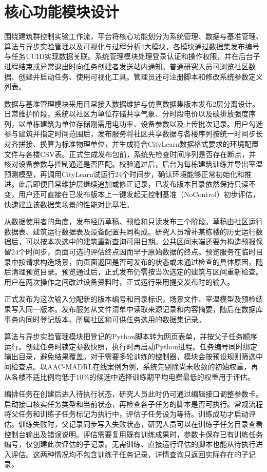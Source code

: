 \section{核心功能模块设计}\label{sec:core-modules}
围绕建筑群控制实验工作流，平台将核心功能划分为系统管理、数据与基准管理、算法与异步实验管理以及可视化与过程分析4大模块，各模块通过数据集发布编号与任务UUID实现数据关联。系统管理模块处理登录认证和操作权限，并在后台子进程结束或异常退出时向任务创建者发送站内通知。普通研究人员可浏览社区数据、创建并启动任务、使用可视化工具。管理员还可注册脚本和修改系统参数定义列表。

数据与基准管理模块采用日常接入数据维护与仿真数据集版本发布2层分离设计。日常维护阶段，系统以社区为单位存储共享气象、分时段电价以及碳排放强度序列，以单栋建筑为单位存储刚需用电功率、设备参数以及上传批次记录。用户勾选参与建筑并指定时间范围后，发布服务将社区共享数据与各楼序列按统一时间步长对齐拼接、换算为标准物理单位，并生成符合CityLearn数据格式要求的环境配置文件与各楼CSV表。正式生成发布包前，系统先检查时间序列是否存在断点，并核对设备参数与控制通道是否匹配。校验通过后，后台为每栋建筑训练并导出室温预测模型，再调用CityLearn试运行24个时间步，确认环境能够正常初始化和推进。此后即便日常维护层继续追加或修正记录，已发布版本目录依然保持只读不变，用户还可直接在已发布版本上一键发起无控制基准（NoControl）初步评估，快速建立该数据集场景的性能对比基准。

从数据使用者的角度，发布经历草稿、预检和只读发布三个阶段。草稿由社区运行数据表、建筑运行数据表及设备配置共同构成。研究人员增补某栋楼的历史运行数据后，可以按本次选中的建筑重新查询可用日期。公共区间末端还要为构造预报保留24个时间步，页面可选的评估终点因而早于原始数据的终点。预览服务在临时目录中按请求构造场景，向页面返回是否可发布的状态或未通过检查的具体原因，随后清理预览目录。预览通过后，正式发布仍需按当次选定的建筑与区间重新检查。用户在两次操作之间改过设备资料时，正式运行采用提交发布时的输入。

正式发布为这次输入分配新的版本编号和目录标识，场景文件、室温模型及预检结果写入同一版本。发布服务从文件清单中读取来源记录和内容摘要，随后在数据库事务内同时登记版本、所属社区和可供任务选用的数据集记录。

算法与异步实验管理模块把登记的Python脚本转为网页表单，并按父子任务顺序运行。创建任务时锁定参数快照，执行时再启动Python进程。任务编号同时绑定输出目录，避免结果覆盖。对于需要多轮训练的控制器，模块会按预设规则筛选中间检查点。以AAC-MADRL在线案例为例，系统先剔除尚未收敛的初始权重，再从各楼不适比例均低于$10\%$的候选中选择训练期平均电费最低的权重用于评估。

编排任务在创建后进入待执行状态，研究人员此时仍可通过编辑接口调整参数卡。启动接口核实任务类型和当前状态，再检查各子任务的脚本是否可执行。常规流程将父任务和训练子任务标记为执行中，评估子任务设为等待。训练成功才启动评估。训练失败时，父记录同步写入失败状态，研究人员可以在训练子任务目录查看控制台输出及错误说明。评估需要复用既有训练成果时，参数卡保存已有训练任务编号，仅创建此次评估的子记录。无需训练、直接运行评估的脚本也能从待执行进入评估。这两种情况均不包含训练子任务记录，详情查询只返回实际存在的子记录。

